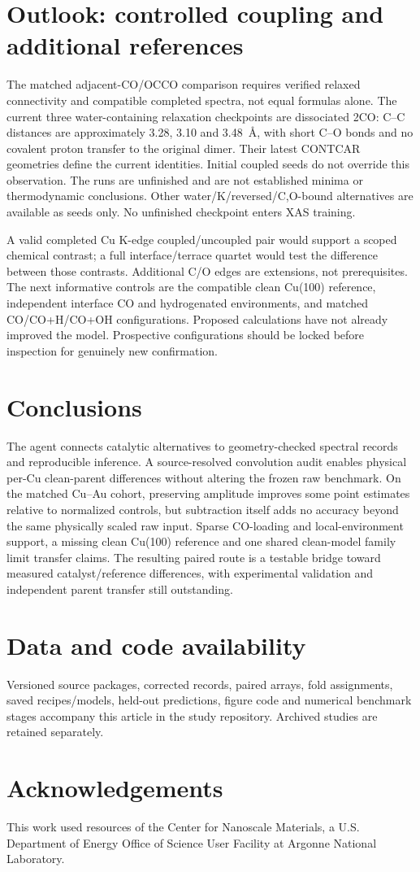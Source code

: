 \documentclass[11pt,a4paper]{article}
\begin{document}
\section{Outlook: controlled coupling and additional references}
The matched adjacent-CO/OCCO comparison requires verified relaxed connectivity and compatible completed spectra, not equal formulas alone. The current three water-containing relaxation checkpoints are dissociated 2CO: C--C distances are approximately 3.28, 3.10 and 3.48~\AA, with short C--O bonds and no covalent proton transfer to the original dimer. Their latest CONTCAR geometries define the current identities. Initial coupled seeds do not override this observation. The runs are unfinished and are not established minima or thermodynamic conclusions. Other water/K/reversed/C,O-bound alternatives are available as seeds only. No unfinished checkpoint enters XAS training.

A valid completed Cu K-edge coupled/uncoupled pair would support a scoped chemical contrast; a full interface/terrace quartet would test the difference between those contrasts. Additional C/O edges are extensions, not prerequisites. The next informative controls are the compatible clean Cu(100) reference, independent interface CO and hydrogenated environments, and matched CO/CO+H/CO+OH configurations. Proposed calculations have not already improved the model. Prospective configurations should be locked before inspection for genuinely new confirmation.

\section{Conclusions}
The agent connects catalytic alternatives to geometry-checked spectral records and reproducible inference. A source-resolved convolution audit enables physical per-Cu clean-parent differences without altering the frozen raw benchmark. On the matched Cu--Au cohort, preserving amplitude improves some point estimates relative to normalized controls, but subtraction itself adds no accuracy beyond the same physically scaled raw input. Sparse CO-loading and local-environment support, a missing clean Cu(100) reference and one shared clean-model family limit transfer claims. The resulting paired route is a testable bridge toward measured catalyst/reference differences, with experimental validation and independent parent transfer still outstanding.

\section*{Data and code availability}
Versioned source packages, corrected records, paired arrays, fold assignments, saved recipes/models, held-out predictions, figure code and numerical benchmark stages accompany this article in the study repository. Archived studies are retained separately.
\section*{Acknowledgements}
This work used resources of the Center for Nanoscale Materials, a U.S. Department of Energy Office of Science User Facility at Argonne National Laboratory.

\end{document}
